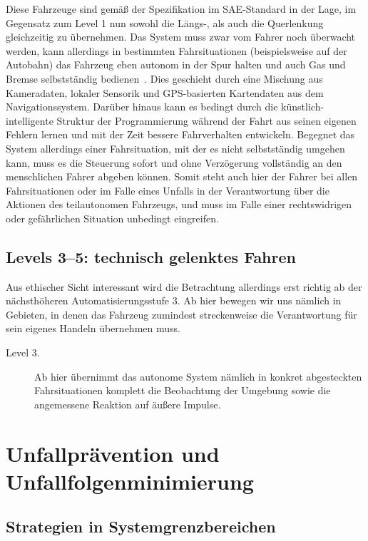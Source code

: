 \documentclass[twocolumn, german]{tum-article}
\begin{document}
\begin{description}
	Diese Fahrzeuge sind gemäß der Spezifikation im SAE-Standard in der Lage, im Gegensatz zum Level 1 nun sowohl die Längs-, als auch die Querlenkung gleichzeitig zu übernehmen.
	Das System muss zwar vom Fahrer noch überwacht werden, kann allerdings in bestimmten Fahrsituationen (beispielsweise auf der Autobahn) das Fahrzeug eben autonom in der Spur halten und auch Gas und Bremse selbstständig bedienen~\cite[S. 1]{bast-levels}.
	Dies geschieht durch eine Mischung aus Kameradaten, lokaler Sensorik und GPS-basierten Kartendaten aus dem Navigationssystem.
	Darüber hinaus kann es bedingt durch die künstlich-intelligente Struktur der Programmierung während der Fahrt aus seinen eigenen Fehlern lernen und mit der Zeit bessere Fahrverhalten entwickeln.
	Begegnet das System allerdings einer Fahrsituation, mit der es nicht selbstständig umgehen kann, muss es die Steuerung sofort und ohne Verzögerung vollständig an den menschlichen Fahrer abgeben können.
	Somit steht auch hier der Fahrer bei allen Fahrsituationen oder im Falle eines Unfalls in der Verantwortung über die Aktionen des teilautonomen Fahrzeugs, und muss im Falle einer rechtswidrigen oder gefährlichen Situation unbedingt eingreifen.
\end{description}


\subsection{Levels 3--5: technisch gelenktes Fahren}
Aus ethischer Sicht interessant wird die Betrachtung allerdings erst richtig ab der nächsthöheren Automatisierungsstufe 3.
Ab hier bewegen wir uns nämlich in Gebieten, in denen das Fahrzeug zumindest streckenweise die Verantwortung für sein eigenes Handeln übernehmen muss.

\begin{description}
	\item[Level 3.] Ab hier übernimmt das autonome System nämlich in konkret abgesteckten Fahrsituationen komplett die Beobachtung der Umgebung sowie die angemessene Reaktion auf äußere Impulse.
\end{description}


\section{Unfallprävention und Unfallfolgenminimierung}
\subsection{Strategien in Systemgrenzbereichen}
\end{document}
